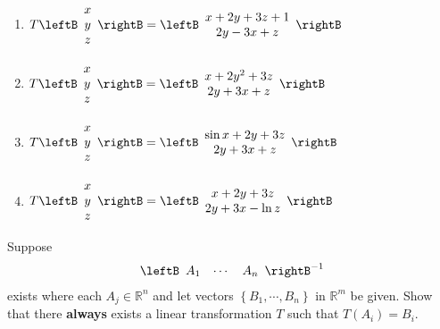 \begin{enumialphparenastyle}
\begin{ex}
\begin{enumerate}
\item $T\leftB
\begin{array}{c}
x \\
y \\
z
\end{array}
\rightB =\leftB
\begin{array}{c}
x+2y+3z+1 \\
2y-3x+z
\end{array}
\rightB $

\item $T\leftB
\begin{array}{c}
x \\
y \\
z
\end{array}
\rightB =\leftB
\begin{array}{c}
x+2y^{2}+3z \\
2y+3x+z
\end{array}
\rightB $

\item $T\leftB
\begin{array}{c}
x \\
y \\
z
\end{array}
\rightB =\leftB
\begin{array}{c}
\sin x+2y+3z \\
2y+3x+z
\end{array}
\rightB $

\item $T\leftB
\begin{array}{c}
x \\
y \\
z
\end{array}
\rightB =\leftB
\begin{array}{c}
x+2y+3z \\
2y+3x-\ln z
\end{array}
\rightB $
\end{enumerate}
\end{ex}


\begin{ex} Suppose 
\begin{equation*}
\leftB
\begin{array}{ccc}
A_{1} & \cdots & A_{n}
\end{array}
\rightB ^{-1}
\end{equation*}
 exists where each $A_{j}\in \mathbb{R}^{n}$ and let
vectors  $\left\{ B_{1},\cdots ,B_{n}\right\} $ in $\mathbb{R}^{m}$ be given. 
Show that there \textbf{always }exists a linear
transformation $T$ such that $T(A_{i})=B_{i}$.
\end{ex}



\end{enumialphparenastyle}
